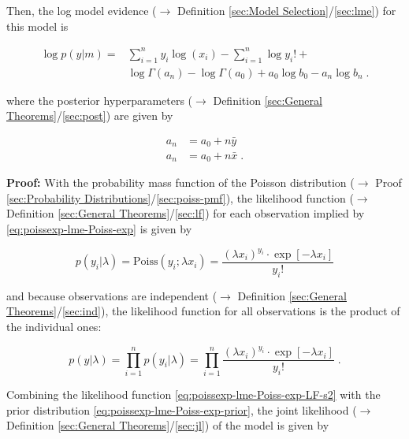 \documentclass[a4paper,12pt,twoside]{book}
\begin{document}
Then, the log model evidence ($\rightarrow$ Definition \ref{sec:Model Selection}/\ref{sec:lme}) for this model is

\begin{equation} \label{eq:poissexp-lme-Poiss-exp-LME}
\begin{split}
\log p(y|m) = &\sum_{i=1}^n y_i \log(x_i) - \sum_{i=1}^n \log y_i ! + \\ 
&\log \Gamma(a_n) - \log \Gamma(a_0) + a_0 \log b_0 - a_n \log b_n \; .
\end{split}
\end{equation}

where the posterior hyperparameters ($\rightarrow$ Definition \ref{sec:General Theorems}/\ref{sec:post}) are given by

\begin{equation} \label{eq:poissexp-lme-Poiss-exp-post-par}
\begin{split}
a_n &= a_0 + n \bar{y} \\
a_n &= a_0 + n \bar{x} \; .
\end{split}
\end{equation}


\vspace{1em}
\textbf{Proof:} With the probability mass function of the Poisson distribution ($\rightarrow$ Proof \ref{sec:Probability Distributions}/\ref{sec:poiss-pmf}), the likelihood function ($\rightarrow$ Definition \ref{sec:General Theorems}/\ref{sec:lf}) for each observation implied by \eqref{eq:poissexp-lme-Poiss-exp} is given by

\begin{equation} \label{eq:poissexp-lme-Poiss-exp-LF-s1}
p(y_i|\lambda) = \mathrm{Poiss}(y_i; \lambda x_i) = \frac{(\lambda x_i)^{y_i} \cdot \exp\left[-\lambda x_i\right]}{y_i !}
\end{equation}

and because observations are independent ($\rightarrow$ Definition \ref{sec:General Theorems}/\ref{sec:ind}), the likelihood function for all observations is the product of the individual ones:

\begin{equation} \label{eq:poissexp-lme-Poiss-exp-LF-s2}
p(y|\lambda) = \prod_{i=1}^n p(y_i|\lambda) = \prod_{i=1}^n \frac{(\lambda x_i)^{y_i} \cdot \exp\left[-\lambda x_i\right]}{y_i !} \; .
\end{equation}

Combining the likelihood function \eqref{eq:poissexp-lme-Poiss-exp-LF-s2} with the prior distribution \eqref{eq:poissexp-lme-Poiss-exp-prior}, the joint likelihood ($\rightarrow$ Definition \ref{sec:General Theorems}/\ref{sec:jl}) of the model is given by
\end{document}

